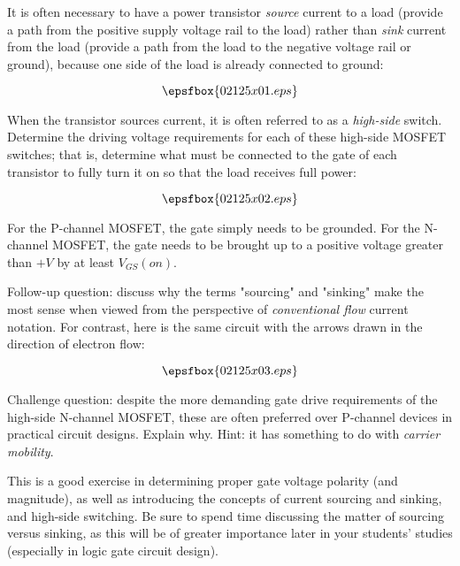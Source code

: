 

It is often necessary to have a power transistor {\it source} current to a load (provide a path from the positive supply voltage rail to the load) rather than {\it sink} current from the load (provide a path from the load to the negative voltage rail or ground), because one side of the load is already connected to ground:

$$\epsfbox{02125x01.eps}$$

When the transistor sources current, it is often referred to as a {\it high-side} switch.  Determine the driving voltage requirements for each of these high-side MOSFET switches; that is, determine what must be connected to the gate of each transistor to fully turn it on so that the load receives full power:

$$\epsfbox{02125x02.eps}$$







For the P-channel MOSFET, the gate simply needs to be grounded.  For the N-channel MOSFET, the gate needs to be brought up to a positive voltage greater than $+V$ by at least $V_{GS}(on)$.

\vskip 10pt

Follow-up question: discuss why the terms "sourcing" and "sinking" make the most sense when viewed from the perspective of {\it conventional flow} current notation.  For contrast, here is the same circuit with the arrows drawn in the direction of electron flow:

$$\epsfbox{02125x03.eps}$$

Challenge question: despite the more demanding gate drive requirements of the high-side N-channel MOSFET, these are often preferred over P-channel devices in practical circuit designs.  Explain why.  Hint: it has something to do with {\it carrier mobility}.







This is a good exercise in determining proper gate voltage polarity (and magnitude), as well as introducing the concepts of current sourcing and sinking, and high-side switching.  Be sure to spend time discussing the matter of sourcing versus sinking, as this will be of greater importance later in your students' studies (especially in logic gate circuit design).




